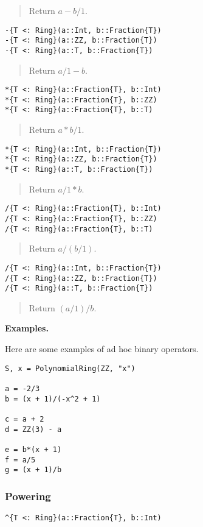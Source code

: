 \documentclass[a4paper,10pt]{article}
\newcommand{\desc}[1]{\vspace{-3mm}\begin{quote}#1\end{quote}}
\begin{document}
{{{\desc{Return $a - b/1$.}

\begin{lstlisting}
-{T <: Ring}(a::Int, b::Fraction{T})
-{T <: Ring}(a::ZZ, b::Fraction{T})
-{T <: Ring}(a::T, b::Fraction{T})
\end{lstlisting}

\desc{Return $a/1 - b$.}

\begin{lstlisting}
*{T <: Ring}(a::Fraction{T}, b::Int)
*{T <: Ring}(a::Fraction{T}, b::ZZ)
*{T <: Ring}(a::Fraction{T}, b::T)
\end{lstlisting}

\desc{Return $a * b/1$.}

\begin{lstlisting}
*{T <: Ring}(a::Int, b::Fraction{T})
*{T <: Ring}(a::ZZ, b::Fraction{T})
*{T <: Ring}(a::T, b::Fraction{T})
\end{lstlisting}

\desc{Return $a/1 * b$.}

\begin{lstlisting}
/{T <: Ring}(a::Fraction{T}, b::Int)
/{T <: Ring}(a::Fraction{T}, b::ZZ)
/{T <: Ring}(a::Fraction{T}, b::T)
\end{lstlisting}

\desc{Return $a / (b/1)$.}

\begin{lstlisting}
/{T <: Ring}(a::Int, b::Fraction{T})
/{T <: Ring}(a::ZZ, b::Fraction{T})
/{T <: Ring}(a::T, b::Fraction{T})
\end{lstlisting}

\desc{Return $(a/1) / b$.}

\textbf{Examples.}

Here are some examples of ad hoc binary operators.

\begin{lstlisting}
S, x = PolynomialRing(ZZ, "x")

a = -2/3
b = (x + 1)/(-x^2 + 1)

c = a + 2
d = ZZ(3) - a

e = b*(x + 1)
f = a/5
g = (x + 1)/b
\end{lstlisting}

\subsubsection{Powering}

\begin{lstlisting}
^{T <: Ring}(a::Fraction{T}, b::Int)
\end{lstlisting}

}}}
\end{document}
